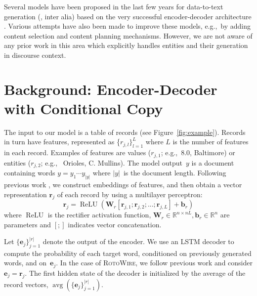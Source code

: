 \documentclass[11pt,a4paper]{article}
\DeclareMathOperator\myrelu{\operatorname{ReLU}}
\DeclareMathOperator\avg{\operatorname{avg}}
\newcommand{\lform}[1]{\textsf{\scriptsize{#1}}}
\begin{document}
Several models have been proposed in the last few years for
data-to-text generation (\citealt{N16-1086,D16-1128,D17-1239}, inter
alia) based on the very successful encoder-decoder architecture
\cite{DBLP:journals/corr/BahdanauCB14}. Various attempts have also
been made to improve these models, e.g.,~by adding content selection
\cite{N18-1137} and content planning
\cite{DBLP:journals/corr/abs-1809-00582} mechanisms. However, we are
not aware of any prior work in this area which explicitly handles
entities and their generation in discourse context.







\section{Background: Encoder-Decoder with Conditional Copy}
\label{sec:ed-cc}

The input to our model is a table of records (see
Figure~\ref{fig:example}). Records in turn have features, 
represented as \{$r_{j,l}\}_{l=1}^{L}$ where $L$
is the number of features in each record.
Examples of features are values ($r_{j,1}$; e.g.,~\lform{\small 8.0},
\lform{\small Baltimore}) or entities ($r_{j,2}$; e.g.,~\lform{\small
  Orioles}, \lform{\small C. Mullins}).  The model output~$y$ is
a document containing words $y = y_1 \cdots y_{|y|}$ where $|y|$~is
the document length.
Following previous work
\cite{D17-1239,DBLP:journals/corr/abs-1809-00582}, we
construct embeddings of features, and then obtain a vector
representation $\mathbf{r}_j$ of each record by using a multilayer
perceptron:
\begin{equation}
\label{eq:mlp-records}
\mathbf{r}_j = \myrelu(\mathbf{W}_r[\mathbf{r}_{j,1};\mathbf{r}_{j,2};...;\mathbf{r}_{j,L}]+\mathbf{b}_r) 
\end{equation}
where $\myrelu$ is the rectifier activation function,
$\mathbf{W}_r \in \mathbb{R}^{n \times nL} , \mathbf{b}_r \in
\mathbb{R}^{n}$ are parameters and 
$[;]$ indicates vector concatenation.

Let $\{ \mathbf{e}_j \}_{j=1}^{|r|}$ denote the output of the
encoder. We use an LSTM decoder to compute the probability of each
target word, conditioned on previously generated words, and
on~$\mathbf{e}_j$.  In the case of \textsc{RotoWire}, we follow
previous work
\cite{D17-1239,DBLP:journals/corr/abs-1809-00582} and
consider $\mathbf{e}_j = \mathbf{r}_j$.  The first hidden state of the
decoder is initialized by the average of the record vectors,
$\avg( \{ \mathbf{e}_j \}_{j=1}^{|r|} )$.
\end{document}
